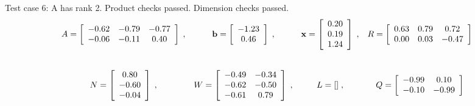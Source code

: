 {Test case 6: A has rank 2. Product checks passed. Dimension checks passed.
\[
\begin{array}{*{4}{c}}
A = \left[\begin{array}{*{3}c}
	-0.62 & -0.79 & -0.77\\
	-0.06 & -0.11 & 0.40
\end{array}\right]
\;, & 
\mathbf{b} = \left[\begin{array}{*{1}c}
	-1.23\\
	0.46
\end{array}\right]
\;, & 
\mathbf{x} = \left[\begin{array}{*{1}c}
	0.20\\
	0.19\\
	1.24
\end{array}\right]
\;, & 
R = \left[\begin{array}{*{3}c}
	0.63 & 0.79 & 0.72\\
	0.00 & 0.03 & -0.47
\end{array}\right]
\\
\\\mbox{}\\
N = \left[\begin{array}{*{1}c}
	0.80\\
	-0.60\\
	-0.04
\end{array}\right]
\;, & 
W = \left[\begin{array}{*{2}c}
	-0.49 & -0.34\\
	-0.62 & -0.50\\
	-0.61 & 0.79
\end{array}\right]
\;, & 
L = []\;, & 
Q = \left[\begin{array}{*{2}c}
	-0.99 & 0.10\\
	-0.10 & -0.99
\end{array}\right]
\\
\end{array}
\]
\hrulefill

}